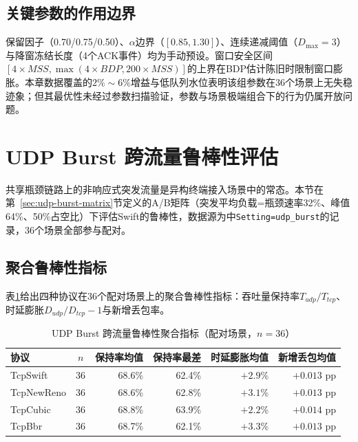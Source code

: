 \subsection{关键参数的作用边界}

保留因子（0.70/0.75/0.50）、$\alpha$边界（$[0.85,1.30]$）、连续递减阈值（$D_{\max}=3$）与降窗冻结长度（4个ACK事件）均为手动预设。窗口安全区间$[4\times MSS, \max(4\times BDP, 200\times MSS)]$的上界在BDP估计陈旧时限制窗口膨胀。本章数据覆盖的$2\%\sim6\%$增益与低队列水位表明该组参数在36个场景上无失稳迹象；但其最优性未经过参数扫描验证，参数与场景极端组合下的行为仍属开放问题。

\section{UDP Burst 跨流量鲁棒性评估}
\label{sec:udp-burst-robustness}

共享瓶颈链路上的非响应式突发流量是异构终端接入场景中的常态。本节在第~\ref{sec:udp-burst-matrix}节定义的A/B矩阵（突发平均负载=瓶颈速率32\%、峰值64\%、50\%占空比）下评估Swift的鲁棒性，数据源为中\texttt{Setting=udp\_burst}的记录，36个场景全部参与配对。

\subsection{聚合鲁棒性指标}

表\ref{tab:udp-burst-agg}给出四种协议在36个配对场景上的聚合鲁棒性指标：吞吐量保持率$T_{udp}/T_{tcp}$、时延膨胀$D_{udp}/D_{tcp}-1$与新增丢包率。

\begin{table}[htbp]
\centering
\caption{UDP Burst 跨流量鲁棒性聚合指标（配对场景，$n=36$）}
\label{tab:udp-burst-agg}
\small
\begin{tabular}{|l|c|r|r|r|r|}
\hline
\textbf{协议} & \textbf{$n$} & \textbf{保持率均值} & \textbf{保持率最差} & \textbf{时延膨胀均值} & \textbf{新增丢包均值} \\
\hline
TcpSwift    & 36 & 68.6\% & 62.4\% & $+2.9$\% & $+0.013$ pp \\
TcpNewReno  & 36 & 68.6\% & 62.8\% & $+3.1$\% & $+0.013$ pp \\
TcpCubic    & 36 & 68.8\% & 63.9\% & $+2.2$\% & $+0.014$ pp \\
TcpBbr      & 36 & 68.7\% & 62.1\% & $+3.3$\% & $+0.013$ pp \\
\hline
\end{tabular}
\end{table}

